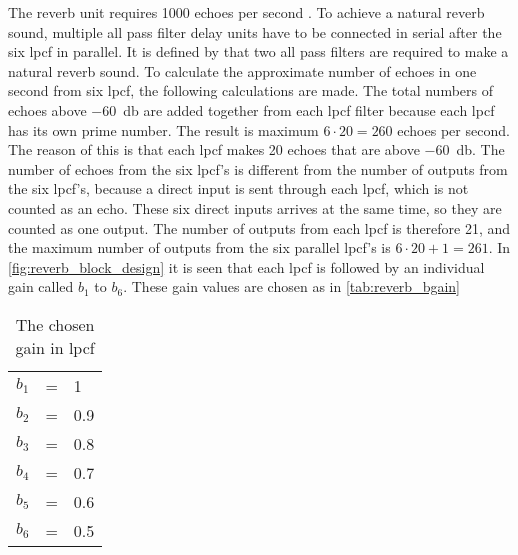 %


The \gls{reverb} unit requires 1000 echoes per second \citep{natural_sounding_revorb}. To achieve a natural \gls{reverb} sound, multiple all pass filter delay units have to be connected in serial after the six \gls{lpcf} in parallel. It is defined by \citep{natural_sounding_revorb} that two all pass filters are required to make a natural \gls{reverb} sound.
To calculate the approximate number of echoes in one second from six \gls{lpcf}, the following calculations are made. The total numbers of echoes above \SI{-60}{\decibel} are added together from each \gls{lpcf} filter because each \gls{lpcf} has its own prime number. The result is maximum $6 \cdot 20 = 260$ echoes per second. The reason of this is that each \gls{lpcf} makes 20 echoes that are above \SI{-60}{\decibel}. The number of echoes from the six \gls{lpcf}'s is different from the number of outputs from the six \gls{lpcf}'s, because a direct input is sent through each \gls{lpcf}, which is not counted as an echo. These six direct inputs arrives at the same time, so they are counted as one output. The number of outputs from each \gls{lpcf} is therefore 21, and the maximum number of outputs from the six parallel \gls{lpcf}'s is $6 \cdot 20 + 1 = 261$.  In \autoref{fig:reverb_block_design} it is seen that each \gls{lpcf} is followed by an individual gain called $b_1$ to $b_6$. These gain values are chosen as in \autoref{tab:reverb_bgain}

\begin{table}[htbp]
\centering
\caption{The chosen gain in \gls{lpcf}}
\label{tab:reverb_bgain}
\begin{tabular}{lll}
$b_1$ & = & 1 \\
$b_2$ & = & 0.9 \\
$b_3$ & = & 0.8 \\
$b_4$ & = & 0.7 \\
$b_5$ & = & 0.6 \\
$b_6$ & = & 0.5 
\end{tabular}
\end{table}

